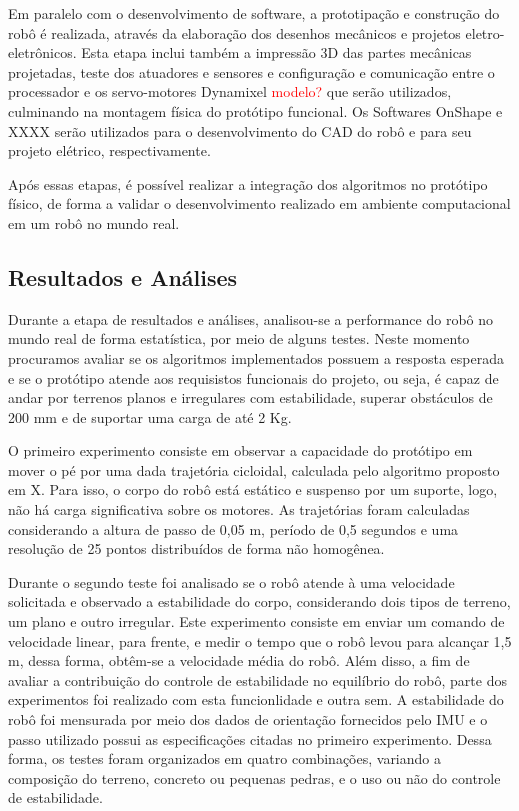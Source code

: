 \documentclass[../main.tex]{subfiles}
\begin{document}
  Em paralelo com o desenvolvimento de software, a prototipação e construção do robô é realizada, através da elaboração dos desenhos mecânicos e projetos eletro-eletrônicos. Esta etapa inclui também a impressão 3D das partes mecânicas projetadas, teste dos atuadores e sensores e configuração e comunicação entre o processador e os servo-motores Dynamixel \textcolor{red}{modelo?} que serão utilizados, culminando na montagem física do protótipo funcional. Os Softwares OnShape e XXXX serão utilizados para o desenvolvimento do CAD do robô e para seu projeto elétrico, respectivamente.

  Após essas etapas, é possível realizar a integração dos algoritmos no protótipo físico, de forma a validar o desenvolvimento realizado em ambiente computacional em um robô no mundo real.

  \subsection{Resultados e Análises}
  Durante a etapa de resultados e análises, analisou-se a performance do robô no mundo real de forma estatística, por meio de alguns testes. Neste momento procuramos avaliar se os algoritmos implementados possuem a resposta esperada e se o protótipo atende aos requisistos funcionais do projeto, ou seja, é capaz de andar por terrenos planos e irregulares com estabilidade, superar obstáculos  de 200 mm e de suportar uma carga de até 2 Kg.

  O primeiro experimento consiste em observar a capacidade do protótipo em mover o pé por uma dada trajetória cicloidal, calculada pelo algoritmo proposto em X. Para isso, o corpo do robô está estático e suspenso por um suporte, logo, não há carga significativa sobre os motores. As trajetórias foram calculadas considerando a altura de passo de 0,05 m, período de 0,5 segundos e uma resolução de 25 pontos distribuídos de forma não homogênea. 
  
  Durante o segundo teste foi analisado se o robô atende à uma velocidade solicitada e observado a estabilidade do corpo, considerando dois tipos de terreno, um plano e outro irregular. Este experimento consiste em enviar um comando de velocidade linear, para frente, e medir o tempo que o robô levou para alcançar 1,5 m, dessa forma, obtêm-se a velocidade média do robô.  Além disso, a fim de avaliar a contribuição do controle de estabilidade no equilíbrio do robô, parte dos experimentos foi realizado com esta funcionlidade e outra sem. A estabilidade do robô foi mensurada por meio dos dados de orientação fornecidos pelo IMU e o passo utilizado possui as especificações citadas no primeiro experimento. Dessa forma, os testes foram organizados em quatro combinações, variando a composição do terreno, concreto ou pequenas pedras, e o uso ou não do controle de estabilidade.
  
\end{document}
